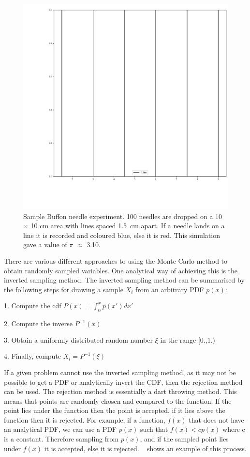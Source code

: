 \begin{figure}[!htbp]
    \centering
    \includegraphics[width=.55\textwidth]{buffon.pdf}
    \caption{Sample Buffon needle experiment. 100 needles are dropped on a 10 $\times$ 10 cm area with lines spaced 1.5~cm apart. If a needle lands on a line it is recorded and coloured blue, else it is red. This simulation gave a value of $\pi$ $\approx$ 3.10.}
    \label{fig:buffon-needle}
\end{figure}

There are various different approaches to using the Monte Carlo method to obtain randomly sampled variables.
One analytical way of achieving this is the inverted sampling method.
The inverted sampling method can be summarised by the following steps for drawing a sample $X_i$ from an arbitrary PDF $p(x)$:

\medskip

1. Compute the \gls*{cdf} $P(x)=\int^{x}_{0}p(x')dx'$

2. Compute the inverse $P^{-1}(x)$

3. Obtain a uniformly distributed random number $\xi$ in the range [0.,1.)

4. Finally, compute $X_i = P^{-1}(\xi)$

\medskip

If a given problem cannot use the inverted sampling method, as it may not be possible to get a PDF or analytically invert the CDF, then the rejection method can be used.
The rejection method is essentially a dart throwing method.
This means that points are randomly chosen and compared to the function.
If the point lies under the function then the point is accepted, if it lies above the function then it is rejected.
For example, if a function, $f(x)$ that does not have an analytical PDF, we can use a PDF $p(x)$ such that $f(x) < cp(x)$ where c is a constant.
Therefore sampling from $p(x)$, and if the sampled point lies under $f(x)$ it is accepted, else it is rejected.
~ shows an example of this process.

